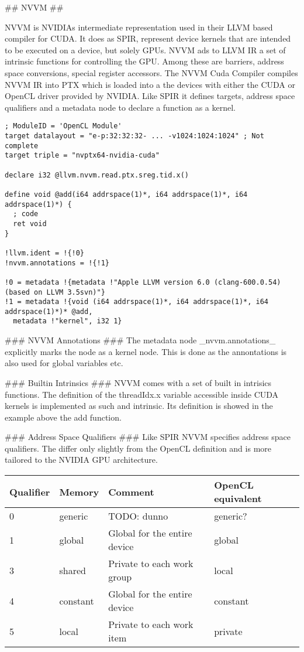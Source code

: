 \begin{markdown}
## NVVM ##

NVVM is NVIDIAs intermediate representation used in their LLVM based
compiler for CUDA. It does as SPIR, represent device kernels that are
intended to be executed on a device, but solely GPUs. NVVM ads to LLVM
IR a set of intrinsic functions for controlling the GPU. Among these
are barriers, address space conversions, special register
accessors. The NVVM Cuda Compiler compiles NVVM IR into PTX which is
loaded into a the devices with either the CUDA or OpenCL driver
provided by NVIDIA. Like SPIR it defines targets, address space
qualifiers and a metadata node to declare a function as a kernel.

\begin{verbatim}
; ModuleID = 'OpenCL Module'
target datalayout = "e-p:32:32:32- ... -v1024:1024:1024" ; Not complete
target triple = "nvptx64-nvidia-cuda"

declare i32 @llvm.nvvm.read.ptx.sreg.tid.x()

define void @add(i64 addrspace(1)*, i64 addrspace(1)*, i64 addrspace(1)*) {
  ; code
  ret void
}

!llvm.ident = !{!0}
!nvvm.annotations = !{!1}

!0 = metadata !{metadata !"Apple LLVM version 6.0 (clang-600.0.54) (based on LLVM 3.5svn)"}
!1 = metadata !{void (i64 addrspace(1)*, i64 addrspace(1)*, i64 addrspace(1)*)* @add,
  metadata !"kernel", i32 1}
\end{verbatim}

### NVVM Annotations ###
The metadata node _nvvm.annotations_ explicitly marks the node as a
kernel node. This is done as the annontations is also used for global
variables etc. 

### Builtin Intrinsics ###
NVVM comes with a set of built in intrisics functions. The definition
of the threadIdx.x variable accessible inside CUDA kernels is
implemented as such and intrinsic. Its definition is showed in the
example above the add function. 

### Address Space Qualifiers ###
Like SPIR NVVM specifies address space qualifiers. The differ only
slightly from the OpenCL definition and is more tailored to the NVIDIA
GPU architecture.
\begin{table}[H]
  \centering
  \begin{tabular}{|l|l|l|l|}
    \hline
    Qualifier & Memory   & Comment                      & OpenCL equivalent \\
    \hline
0         & generic  & TODO: dunno                  & generic?  \\
1         & global   & Global for the entire device & global \\
3         & shared   & Private to each work group   & local \\
4         & constant & Global for the entire device & constant \\
5         & local    & Private to each work item    & private \\
    \hline
  \end{tabular}
\end{table}



\end{markdown}
